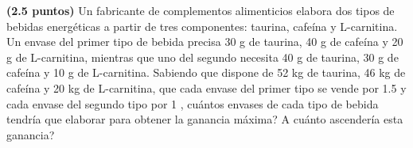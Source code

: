 
\textbf{(2.5 puntos)} Un fabricante de complementos alimenticios elabora dos tipos de bebidas energéticas a partir de tres componentes: taurina, cafeína y L-carnitina. Un envase del primer tipo de bebida precisa 30 g de taurina, 40 g de cafeína y 20 g de L-carnitina, mientras que uno del segundo necesita 40 g de taurina, 30 g de cafeína y 10 g de L-carnitina. Sabiendo que dispone de 52 kg de taurina, 46 kg de cafeína y 20 kg de L-carnitina, que cada envase del primer tipo se vende por 1.5 \texteuro{} y cada envase del segundo tipo por 1 \texteuro{}, \textquestiondown{}cuántos envases de cada tipo de bebida tendría que elaborar para obtener la ganancia máxima? \textquestiondown{}A cuánto ascendería esta ganancia?

